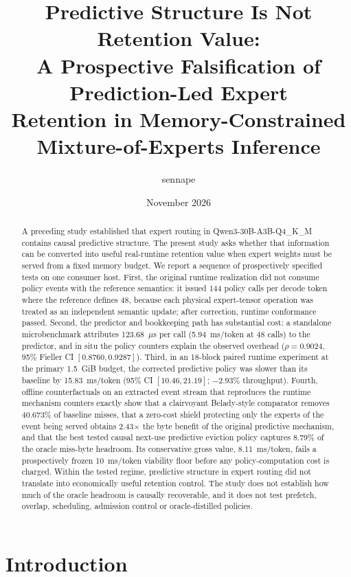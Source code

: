 \documentclass[11pt]{article}
\title{\textbf{Predictive Structure Is Not Retention Value:\\
A Prospective Falsification of Prediction-Led Expert\\
Retention in Memory-Constrained Mixture-of-Experts Inference}}
\author{sennape}
\date{November 2026}
\theoremstyle{plain}
\theoremstyle{definition}
\begin{document}
\maketitle

\begin{abstract}
A preceding study established that expert routing in Qwen3-30B-A3B-Q4\_K\_M contains causal predictive structure. The present study asks whether that information can be converted into useful real-runtime retention value when expert weights must be served from a fixed memory budget. We report a sequence of prospectively specified tests on one consumer host. First, the original runtime realization did not consume policy events with the reference semantics: it issued 144 policy calls per decode token where the reference defines 48, because each physical expert-tensor operation was treated as an independent semantic update; after correction, runtime conformance passed. Second, the predictor and bookkeeping path has substantial cost: a standalone microbenchmark attributes 123.68~$\mu$s per call (5.94~ms/token at 48 calls) to the predictor, and in situ the policy counters explain the observed overhead ($\rho=0.9024$, 95\% Fieller CI $[0.8760, 0.9287]$). Third, in an 18-block paired runtime experiment at the primary 1.5~GiB budget, the corrected predictive policy was slower than its baseline by 15.83~ms/token (95\% CI $[10.46, 21.19]$; $-2.93\%$ throughput). Fourth, offline counterfactuals on an extracted event stream that reproduces the runtime mechanism counters exactly show that a clairvoyant Belady-style comparator removes 40.673\% of baseline misses, that a zero-cost shield protecting only the experts of the event being served obtains 2.43$\times$ the byte benefit of the original predictive mechanism, and that the best tested causal next-use predictive eviction policy captures 8.79\% of the oracle miss-byte headroom. Its conservative gross value, 8.11~ms/token, fails a prospectively frozen 10~ms/token viability floor before any policy-computation cost is charged. Within the tested regime, predictive structure in expert routing did not translate into economically useful retention control. The study does not establish how much of the oracle headroom is causally recoverable, and it does not test prefetch, overlap, scheduling, admission control or oracle-distilled policies.
\end{abstract}

\section{Introduction}
\label{sec:intro}
\end{document}
